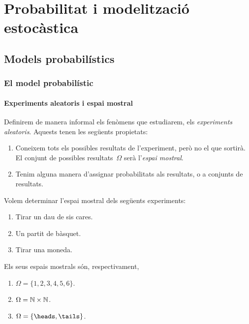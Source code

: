 \documentclass[../Apunts.tex]{subfiles}
\begin{document}
\part{Probabilitat i modelització estocàstica}
\chapter{Models probabilístics}
\section{El model probabilístic}
	\subsection{Experiments aleatoris i espai mostral}
	\begin{definition}
		\label{def:experiment aleatori}
		\label{def:espai mostral}
		Definirem de manera informal els fenòmens que estudiarem, els \emph{experiments aleatoris}. Aquests tenen les següents propietats:
		\begin{enumerate}
			\item Coneixem tots els possibles resultats de l'experiment, però no el que sortirà. El conjunt de possibles resultats~\(\Omega\) serà l'\emph{espai mostral}.
			\item Tenim alguna manera d'assignar probabilitats als resultats, o a conjunts de resultats.
		\end{enumerate}
	\end{definition}
	\begin{example}
		Volem determinar l'espai mostral dels següents experiments:
		\begin{enumerate}
			\item Tirar un dau de sis cares.
			\item Un partit de bàsquet.
			\item Tirar una moneda.
		\end{enumerate}
		\begin{solution}
			Els seus espais mostrals són, respectivament,
			\begin{enumerate}
				\item \(\Omega=\{1,2,3,4,5,6\}\).
				\item \(\Omega=\mathbb{N}\times\mathbb{N}\).
				\item \(\Omega=\{\heads,\tails\}\).\qedhere
			\end{enumerate}
		\end{solution}
	\end{example}
\end{document}
